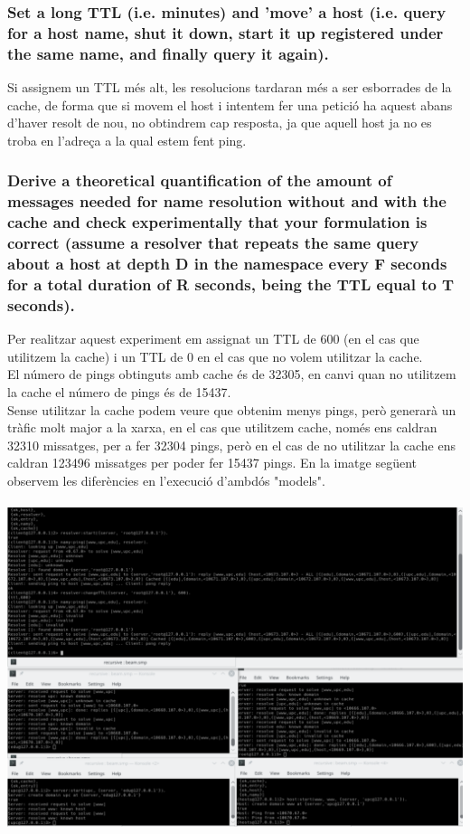 \documentclass[a4paper, 10pt]{article}
\begin{document}
\subsubsection{Set a long TTL (i.e. minutes) and ’move’ a host (i.e. query for a host name, shut it down, start it up registered under the same name, and finally query it again).}
Si assignem un TTL més alt, les resolucions tardaran més a ser esborrades de la cache, de forma que si movem el host i intentem fer una petició ha aquest abans d'haver resolt de nou, no obtindrem cap resposta, ja que aquell host ja no es troba en l'adreça a la qual estem fent ping.
\newpage\subsubsection{Derive a theoretical quantification of the amount of messages needed for name resolution without and with the cache and check experimentally that your formulation is correct (assume a resolver that repeats the same query about a host at depth D in the namespace every F seconds for a total duration of R seconds, being the TTL equal to T seconds).}
Per realitzar aquest experiment em assignat un TTL de 600 (en el cas que utilitzem la cache) i un TTL de 0 en el cas que no volem utilitzar la cache.\\
El número de pings obtinguts amb cache és de 32305, en canvi quan no utilitzem la cache el número de pings és de 15437.\\
Sense utilitzar la cache podem veure que obtenim menys pings, però generarà un tràfic molt major a la xarxa, en el cas que utilitzem cache, només ens caldran 32310 missatges, per a fer 32304 pings, però en el cas de no utilitzar la cache ens caldran 123496 missatges per poder fer 15437 pings. En la imatge següent observem les diferències en l'execució d'ambdós "models".\\\\
\includegraphics[width=\textwidth]{Ex3.png}
\end{document}
